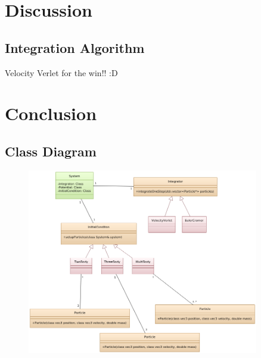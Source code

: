 \documentclass[10pt,a4paper]{amsart}
\begin{document}
\section{Discussion}

\subsection{Integration Algorithm}

Velocity Verlet for the win!! :D

\section{Conclusion}

\pagebreak

\begin{appendix}

\section{Class Diagram}
\label{app:classdiagram}

\begin{figure}[ht]
	\centering
	\includegraphics[width=0.9\textwidth]{../figures/classdiagram.png}
\end{figure}

\end{appendix}
\end{document}
